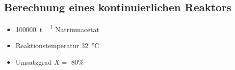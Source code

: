 \subsection{Berechnung eines kontinuierlichen Reaktors}
\begin{itemize}
	\item \SI{100 000}{\tonne\per\year} Natriumacetat
	\item Reaktionstemperatur \SI{32}{\degreeCelsius}
	\item Umsatzgrad $X=$ 80\%
\end{itemize}
